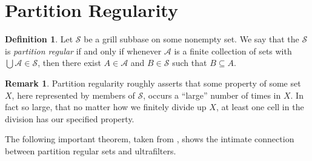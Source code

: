 \documentclass[12pt]{article}
\theoremstyle{plain}
\theoremstyle{definition}
\newtheorem{defn}[thm]{Definition}
\newtheorem{rmk}[thm]{Remark}
\newcommand{\calA}{\mathcal{A}}
\newcommand{\calS}{\mathcal{S}}
\begin{document}
\section{Partition Regularity}

\begin{defn}
  Let $\calS$ be a grill subbase on some nonempty set.
  We say that the $\calS$ is \textsl{partition regular} if and only if whenever $\calA$ is a finite collection of sets with $\bigcup\calA \in \calS$, then there exist $A \in \calA$ and $B \in \calS$ such that $B \subseteq A$.
\end{defn}
\begin{rmk}
Partition regularity roughly asserts that some property of some set $X$, here represented by members of $\calS$, occurs a ``large'' number of times in $X$.
In fact so large, that no matter how we finitely divide up $X$, at least one cell in the division has our specified property. 
\end{rmk}

The following important theorem, taken from \cite[Theorem 3.11]{Hindman:1998fk}, shows the intimate connection between partition regular sets and ultrafilters.
\end{document}
